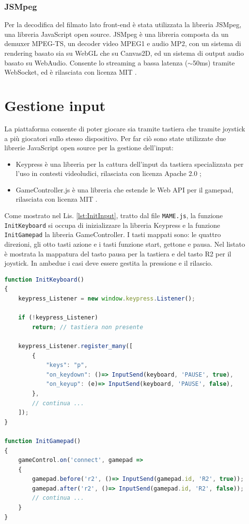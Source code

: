 \subsubsection{JSMpeg}
Per la decodifica del filmato lato front-end è stata utilizzata la libreria JSMpeg, una libreria JavaScript open source. JSMpeg è una libreria composta da un demuxer MPEG-TS, un decoder video MPEG1 e audio MP2, con un sistema di rendering basato sia su WebGL che su Canvas2D, ed un sistema di output audio basato su WebAudio. Consente lo streaming a bassa latenza ($\sim$50ms) tramite WebSocket, ed è rilasciata con licenza MIT \parencite{JSMpeg}.




\section{Gestione input}
La piattaforma consente di poter giocare sia tramite tastiera che tramite joystick a più giocatori sullo stesso dispositivo. Per far ciò sono state utilizzate due librerie JavaScript open source per la gestione dell'input:

\begin{itemize}
	\item Keypress è una libreria per la cattura dell'input da tastiera specializzata per l'uso in contesti videoludici, rilasciata con licenza Apache 2.0 \parencite{Keypress};
	\item GameController.js è una libreria che estende le Web API per il gamepad, rilasciata con licenza MIT \parencite{gameController_js}.
\end{itemize}

Come mostrato nel Lis. \ref{lst:InitInput}, tratto dal file \verb|MAME.js|, la funzione \verb|InitKeyboard| si occupa di inizializzare la libreria Keypress e la funzione \verb|InitGamepad| la libreria GameController. I tasti mappati sono: le quattro direzioni, gli otto tasti azione e i tasti funzione start, gettone e pausa. Nel listato è mostrata la mappatura del tasto pausa per la tastiera e del tasto R2 per il joystick. In ambedue i casi deve essere gestita la pressione e il rilascio.

\begin{lstlisting}[language=JavaScript, caption=Codice relativo alla gestione input lato client, label={lst:InitInput}]
function InitKeyboard()
{
	keypress_Listener = new window.keypress.Listener();

	if (!keypress_Listener)
		return; // tastiera non presente

	keypress_Listener.register_many([
		{
			"keys": "p",
			"on_keydown": ()=> InputSend(keyboard, 'PAUSE', true),
			"on_keyup": (e)=> InputSend(keyboard, 'PAUSE', false),
		},
		// continua ...
	]);
}

function InitGamepad()
{
	gameControl.on('connect', gamepad =>
	{
		gamepad.before('r2', ()=> InputSend(gamepad.id, 'R2', true));
		gamepad.after('r2', ()=> InputSend(gamepad.id, 'R2', false));
		// continua ...
	}
}
\end{lstlisting}
	
